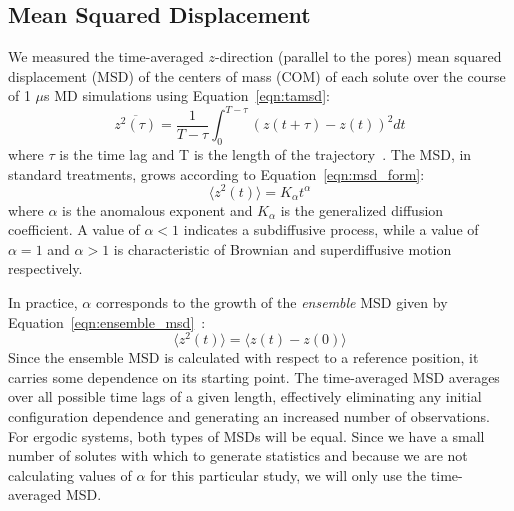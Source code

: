 \documentclass[journal=jpcbfk,manuscript=article]{achemso}
\begin{document}
  \subsection{Mean Squared Displacement}\label{method:MSD}

  We measured the time-averaged $z$-direction (parallel to the pores) mean squared
  displacement (MSD) of the centers of mass (COM) of each solute over the course of 
  1 $\mu$s MD simulations using 
  Equation~\ref{eqn:tamsd}:
  \begin{equation}
	\overline{z^2(\tau)} = \dfrac{1}{T - \tau}\int_{0}^{T - \tau} (z(t + \tau) - z(t))^2 dt
	\label{eqn:tamsd}
  \end{equation}
  where $\tau$ is the time lag and T is the length of the trajectory~\cite{meroz_toolbox_2015}. 
  The MSD, in standard treatments, grows according to Equation~\ref{eqn:msd_form}:
  \begin{equation} 
	\langle z^2(t) \rangle = K_{\alpha}t^\alpha
	\label{eqn:msd_form}
  \end{equation} 
  where $\alpha$ is the anomalous exponent and $K_\alpha$ is the generalized diffusion 
  coefficient. A value of $\alpha < 1$ indicates a subdiffusive process, while a value 
  of $\alpha = 1$ and $\alpha > 1$ is characteristic of Brownian and superdiffusive
  motion respectively.

  In practice, $\alpha$ corresponds to the growth of the \textit{ensemble} MSD given
  by Equation~\ref{eqn:ensemble_msd}~\cite{meroz_toolbox_2015}:
  \begin{equation}
	\langle z^2(t) \rangle = \langle z(t) - z(0) \rangle
	\label{eqn:ensemble_msd}
  \end{equation}
  Since the ensemble MSD is calculated with respect to a reference position, it carries
  some dependence on its starting point. The time-averaged MSD averages over all possible
  time lags of a given length, effectively eliminating any initial configuration 
  dependence and generating	an increased number of observations. For ergodic systems, 
  both types of MSDs will be equal. Since we have a small number of solutes with which to
  generate statistics and because we are not calculating values of $\alpha$ for this 
  particular study,	we will only use the time-averaged MSD.
  
\end{document}

